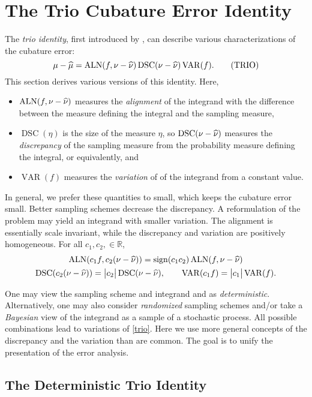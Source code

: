 \documentclass[graybox]{svmult}
\newcommand{\R}{\mathbb{R}} %
\DeclareMathOperator{\algn}{ALN}
\DeclareMathOperator{\disc}{DSC}
\DeclareMathOperator{\Var}{VAR}
\DeclareMathOperator{\sign}{sign}
\begin{document}
\section{The Trio Cubature Error Identity}
The \emph{trio identity}, first introduced by  \cite{Meng}, can describe various characterizations of the cubature error:
\begin{equation}
\mu - \hmu = \algn(f,\nu - \hnu) \disc(\nu - \hnu)  \Var(f). \label{trio}\tag{TRIO}
\end{equation}
This section derives various versions of this identity.  Here,
\begin{itemize}
\item $\algn(f,\nu - \hnu)$ measures the \emph{alignment} of the integrand with the difference between the measure defining the integral and the sampling measure,
\item $\disc(\eta)$ is the size of the measure $\eta$, so $\disc(\nu - \hnu)$ measures the \emph{discrepancy} of the sampling measure from the probability measure defining the integral, or equivalently,  and 
\item $\Var(f)$ measures the \emph{variation} of of the integrand from a constant value.
\end{itemize}
In general, we prefer these quantities to small, which keeps the cubature error small.  Better sampling schemes decrease the discrepancy.  A reformulation of the problem may yield an integrand with smaller variation.  The alignment is essentially scale invariant, while the discrepancy and variation are positively homogeneous.  For all $c_1, c_2, \in \R$,
\begin{gather*}
\algn(c_1f,c_2(\nu - \hnu)) =  \sign(c_1 c_2) \algn(f,\nu - \hnu) \\
\disc(c_2(\nu-\hnu))  = \abs{c_2} \disc(\nu-\hnu), \qquad  \Var(c_1f) =  \abs{c_1}\Var(f).
\end{gather*}

One may view the sampling scheme and integrand and as \emph{deterministic}.  Alternatively, one may also consider \emph{randomized} sampling schemes and/or take a \emph{Bayesian} view of the integrand as a sample of a stochastic process.  All possible combinations lead to variations of \cref{trio}.  Here we use more general concepts of the discrepancy and the variation than are common.  The goal is to unify the presentation of the error analysis.



\subsection{The Deterministic Trio  Identity}
\end{document}
